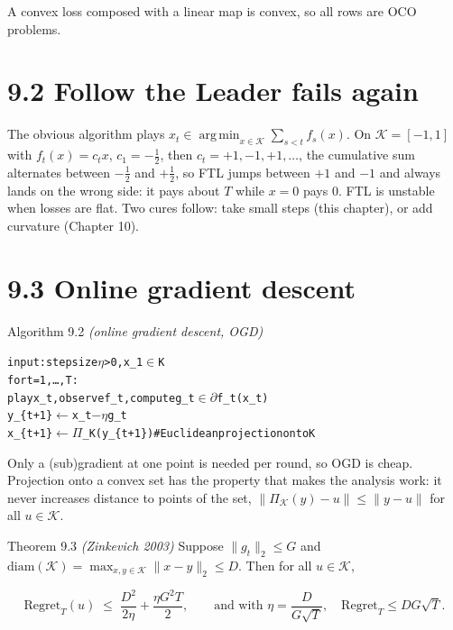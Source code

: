 \documentclass[11pt,a4paper,openany]{book}
\newcommand{\Reg}{\mathrm{Regret}}
\DeclareMathOperator*{\argmin}{arg\,min}
\newcommand{\norm}[1]{\lVert #1\rVert}
\newcommand{\cK}{\mathcal{K}}
\newenvironment{algo}{\par\smallskip\begingroup\footnotesize\begin{alltt}}{\end{alltt}\endgroup\smallskip}
\begin{document}
A convex loss composed with a linear map is convex, so all rows are OCO problems.

\section*{9.2 Follow the Leader fails again}\label{ch9-ftl}

The obvious algorithm plays $x_t\in\argmin_{x\in\cK}\sum_{s<t}f_s(x)$. On $\cK=[-1,1]$ with $f_t(x)=c_tx$, $c_1=-\tfrac12$, then $c_t=+1,-1,+1,\dots$, the cumulative sum alternates between $-\tfrac12$ and $+\tfrac12$, so FTL jumps between $+1$ and $-1$ and always lands on the wrong side: it pays about $T$ while $x=0$ pays $0$. FTL is unstable when losses are flat. Two cures follow: take small steps (this chapter), or add curvature (Chapter 10).

\section*{9.3 Online gradient descent}\label{ch9-ogd}

\begin{balg}{Algorithm 9.2 \emph{(online gradient descent, OGD)}}
\begin{algo}
input: step size \ensuremath{\eta} > 0, x\_1 \ensuremath{\in} K
for t = 1, …, T:
    play x\_t, observe f\_t, compute g\_t \ensuremath{\in} \ensuremath{\partial}f\_t(x\_t)
    y\_\{t+1\} \ensuremath{\leftarrow} x\_t \ensuremath{-} \ensuremath{\eta} g\_t
    x\_\{t+1\} \ensuremath{\leftarrow} \ensuremath{\Pi}\_K(y\_\{t+1\})        \# Euclidean projection onto K
\end{algo}
\end{balg}

Only a (sub)gradient at one point is needed per round, so OGD is cheap. Projection onto a convex set has the property that makes the analysis work: it never increases distance to points of the set, $\norm{\Pi_\cK(y)-u}\le\norm{y-u}$ for all $u\in\cK$.

\begin{bthm}{Theorem 9.3 \emph{(Zinkevich 2003)}}
Suppose $\norm{g_t}_2\le G$ and $\mathrm{diam}(\cK)=\max_{x,y\in\cK}\norm{x-y}_2\le D$. Then for all $u\in\cK$,

\[\Reg_T(u)\;\le\;\frac{D^2}{2\eta}+\frac{\eta G^2T}{2},\qquad\text{and with }\eta=\frac{D}{G\sqrt T},\quad \Reg_T\le DG\sqrt T.\]

\end{bthm}
\end{document}
